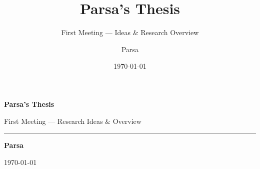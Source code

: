 \documentclass[aspectratio=169, 11pt]{beamer}
\title{Parsa's Thesis}
\subtitle{First Meeting --- Ideas \& Research Overview}
\author{Parsa}
\date{\today}
\begin{document}
{
\begin{frame}[plain]
    \vspace{1.3cm}
    {\LARGE\textbf{Parsa's Thesis}\par}
    \vspace{0.25cm}
    {\large\textcolor{AccentBlue!45!white}{First Meeting --- Research Ideas \& Overview}\par}
    \vspace{0.35cm}
    \textcolor{AccentBlue}{\rule{0.32\textwidth}{2.2pt}}
    \vspace{0.7cm}

    {\normalsize\textbf{Parsa}\par}
    \vspace{0.15cm}
    {\small\textcolor{white!65!SlateDark}{\today}\par}
\end{frame}
}
\end{document}
